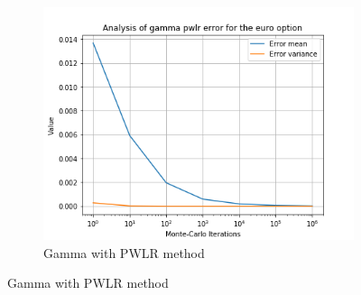\documentclass[12pt,a4paper,fleqn]{article}
\begin{document}
\begin{figure}
\begin{subfigure}[b]{0.3\textwidth}
          \includegraphics[width=\textwidth]{graphs/eurogammapwlr.png}
          \caption{Gamma with PWLR method}
      \end{subfigure}


\end{figure}
\end{document}
